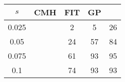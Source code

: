 \centering \begin{tabular}{c|c|c|c|c}
$s$	&CMH	&FIT	&GP	&\sc{Clear}\\\hline
0.025	&	&2	&5	&26\\
0.05	&	&24	&57	&84\\
0.075	&	&61	&93	&95\\
0.1	&	&74	&93	&93\\
\end{tabular}
